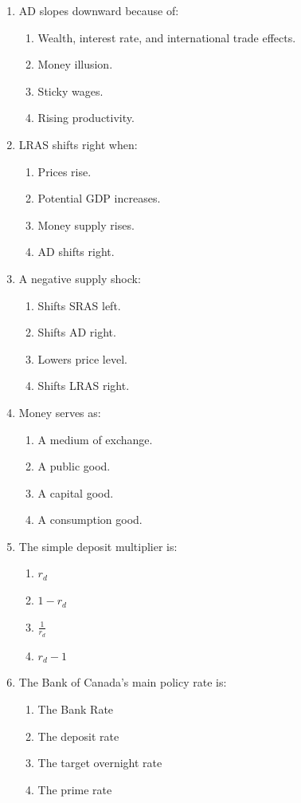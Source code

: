 \documentclass[12pt]{article}
\begin{document}
\begin{enumerate}[label=\textbf{\arabic*.}]
\item AD slopes downward because of:
\begin{enumerate}[label=(\Alph*)]
    \item Wealth, interest rate, and international trade effects.
    \item Money illusion.
    \item Sticky wages.
    \item Rising productivity.
\end{enumerate}

\item LRAS shifts right when:
\begin{enumerate}[label=(\Alph*)]
    \item Prices rise.
    \item Potential GDP increases.
    \item Money supply rises.
    \item AD shifts right.
\end{enumerate}

\item A negative supply shock:
\begin{enumerate}[label=(\Alph*)]
    \item Shifts SRAS left.
    \item Shifts AD right.
    \item Lowers price level.
    \item Shifts LRAS right.
\end{enumerate}

\item Money serves as:
\begin{enumerate}[label=(\Alph*)]
    \item A medium of exchange.
    \item A public good.
    \item A capital good.
    \item A consumption good.
\end{enumerate}
\newpage
\item The simple deposit multiplier is:
\begin{enumerate}[label=(\Alph*)]
    \item $r_d$
    \item $1 - r_d$
    \item $\frac{1}{r_d}$
    \item $r_d - 1$
\end{enumerate}

\item The Bank of Canada's main policy rate is:
\begin{enumerate}[label=(\Alph*)]
    \item The Bank Rate
    \item The deposit rate
    \item The target overnight rate
    \item The prime rate
\end{enumerate}


\end{enumerate}
\end{document}
